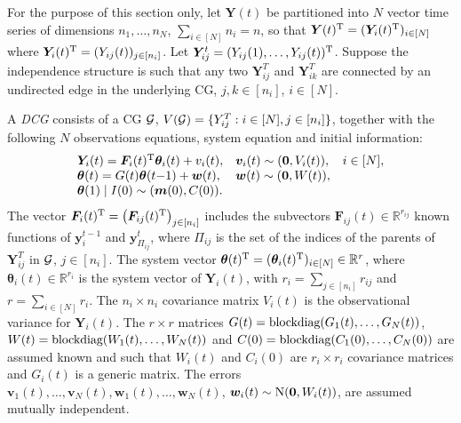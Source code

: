 For the purpose of this section only, let $\bm{Y}(t)$ be partitioned into $N$ vector time series of dimensions $n_1,\dots,n_N$, $\sum_{i\in[N]}n_i=n$, so that $\bm{Y}(t)^{\textnormal{T}}=(\bm{Y}_i(t)^{\textnormal{T}})_{i\in[N]}$ where $\bm{Y}_i(t)^{\textnormal{T}}=(Y_{ij}(t))_{j\in[n_i]}$. Let $\bm{Y}_{ij}^t=(Y_{ij}(1),\dots,Y_{ij}(t))^{\textnormal{T}}$. Suppose the independence structure is such that any two $\bm{Y}_{ij}^T$ and $\bm{Y}_{ik}^T$ are connected by an undirected edge in the underlying CG, $j,k\in [n_i]$, $i\in [N]$. 

\begin{definition}
A \emph{DCG} consists of a CG $\mathcal{G}$, $V(\mathcal{G})=\{Y_{ij}^T:i\in[N],j\in[n_i]\}$, together with the following $N$ observations equations, system equation and initial information:
\begin{equation*}
\begin{array}{lll}
\bm{Y}_i(t)=\bm{F}_i(t)^{\textnormal{T}}\bm{\theta}_i(t)+v_i(t),&\bm{v}_i(t)\sim(\bm{0},V_i(t)), &i\in [N],\\
\bm{\theta}(t)=G(t)\bm{\theta}(t{-1})+\bm{w}(t), & \bm{w}(t)\sim(\bm{0},W(t)),&\\
\bm{\theta}(1)\;|\;I(0)\sim (\bm{m}(0),C(0)).
\end{array}
\end{equation*}
The vector $\bm{F}_i(t)^{\textnormal{T}}=\left(\bm{F}_{ij}(t)^{\textnormal{T}}\right)_{j\in[n_i]}$ includes the subvectors $\bm{F}_{ij}(t)\in\mathbb{R}^{r_{ij}}$ known functions of $\bm{y}^{t-1}_i$ and $\bm{y}^t_{\Pi_{ij}}$, where $\Pi_{ij}$ is the set of the indices of the parents of $\bm{Y}_{ij}^T$ in $\mathcal{G}$, $j\in[n_i]$. The system vector $\bm{\theta}(t)^{\textnormal{T}}=(\bm{\theta}_i(t)^{\textnormal{T}})_{i\in[N]}\in\mathbb{R}^r$, where $\bm{\theta}_i(t)\in\mathbb{R}^{r_i}$ is the system vector of $\bm{Y}_i(t)$, with $r_i=\sum_{j\in[n_i]}r_{ij}$ and $r=\sum_{i\in[N]}r_i$. The $n_i\times n_i$ covariance matrix $V_i(t)$ is the observational variance for $\bm{Y}_i(t)$. The $r\times r$ matrices $G(t)=\textnormal{blockdiag}(G_1(t),\dots,G_N(t))$, $W(t)=\textnormal{blockdiag}(W_1(t),\dots,W_N(t))$ and $C(0)=\textnormal{blockdiag}(C_1(0),\dots,C_N(0))$ are assumed known and such that  $W_i(t)$ and $C_i(0)$ are $r_i\times r_i$ covariance matrices and $G_i(t)$ is a generic matrix. The errors $\bm{v}_1(t),\dots, \bm{v}_N(t),\bm{w}_1(t),\dots,\bm{w}_N(t)$, $\bm{w}_i(t)\sim \textnormal{N}(\bm{0},W_i(t))$, are assumed mutually independent. 
\end{definition}

